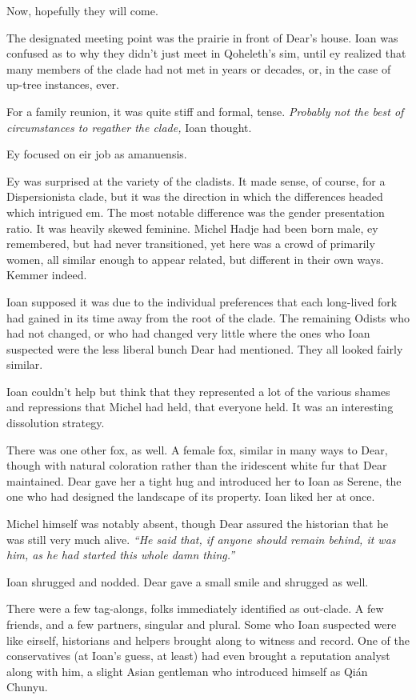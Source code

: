 Now, hopefully they will come.

\secdiv{}

\noindent The designated meeting point was the prairie in front of Dear's house. Ioan was confused as to why they didn't just meet in Qoheleth's sim, until ey realized that many members of the clade had not met in years or decades, or, in the case of up-tree instances, ever.

For a family reunion, it was quite stiff and formal, tense. \emph{Probably not the best of circumstances to regather the clade,} Ioan thought.

Ey focused on eir job as amanuensis.

Ey was surprised at the variety of the cladists. It made sense, of course, for a Dispersionista clade, but it was the direction in which the differences headed which intrigued em. The most notable difference was the gender presentation ratio. It was heavily skewed feminine. Michel Hadje had been born male, ey remembered, but had never transitioned, yet here was a crowd of primarily women, all similar enough to appear related, but different in their own ways. Kemmer indeed.

Ioan supposed it was due to the individual preferences that each long-lived fork had gained in its time away from the root of the clade. The remaining Odists who had not changed, or who had changed very little where the ones who Ioan suspected were the less liberal bunch Dear had mentioned. They all looked fairly similar.

Ioan couldn't help but think that they represented a lot of the various shames and repressions that Michel had held, that everyone held. It was an interesting dissolution strategy.

There was one other fox, as well. A female fox, similar in many ways to Dear, though with natural coloration rather than the iridescent white fur that Dear maintained. Dear gave her a tight hug and introduced her to Ioan as Serene, the one who had designed the landscape of its property. Ioan liked her at once.

Michel himself was notably absent, though Dear assured the historian that he was still very much alive. \emph{``He said that, if anyone should remain behind, it was him, as he had started this whole damn thing.''}

Ioan shrugged and nodded. Dear gave a small smile and shrugged as well.

There were a few tag-alongs, folks immediately identified as out-clade. A few friends, and a few partners, singular and plural. Some who Ioan suspected were like eirself, historians and helpers brought along to witness and record. One of the conservatives (at Ioan's guess, at least) had even brought a reputation analyst along with him, a slight Asian gentleman who introduced himself as Qián Chunyu.

